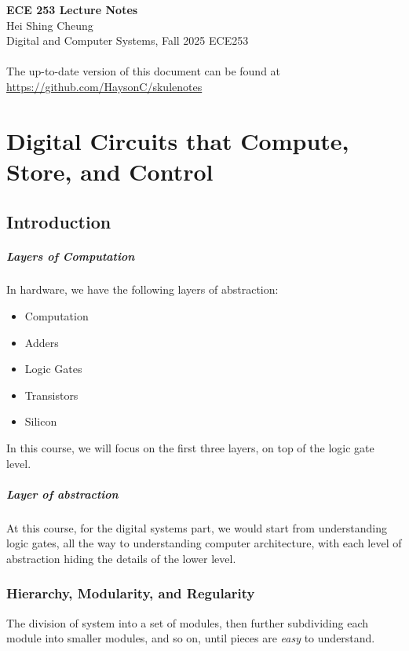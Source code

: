 \documentclass[11pt]{report}
\begin{document}
\thispagestyle{empty}
{\LARGE \bf ECE 253 Lecture Notes}\\
{\large Hei Shing Cheung}\\
Digital and Computer Systems, Fall 2025 \hfill ECE253\\
\\
The up-to-date version of this document can be found at \url{https://github.com/HaysonC/skulenotes}\\

\chapter{Digital Circuits that Compute, Store, and Control}
\begin{shaded}
\section*{Introduction}
\paragraph{Layers of Computation} In hardware, we have the following layers of abstraction:
\begin{itemize}
    \item Computation
    \item Adders 
    \item Logic Gates
    \item Transistors
    \item Silicon
\end{itemize}
In this course, we will focus on the first three layers, on top of the logic gate level.


\paragraph{Layer of abstraction} At this course, for the digital systems part, we would start from understanding logic gates, all the way to understanding computer architecture, with each level of abstraction hiding the details of the lower level.

\subsection{Hierarchy, Modularity, and Regularity}

\begin{definition}[Hierarchy]
    The division of system into a set of modules, then further subdividing each module into smaller modules, and so on, until pieces are \textit{easy} to understand.    
\end{definition}


\end{shaded}
\end{document}
